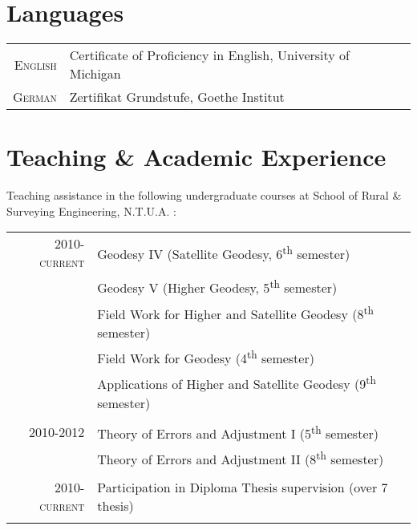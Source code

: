 \documentclass[a4paper,10pt]{article} %
\begin{document}
\section{Languages}
\begin{tabular}{rp{13cm}}

\textsc{English} & Certificate of Proficiency in English, University of Michigan \\
\textsc{German} & Zertifikat Grundstufe, Goethe Institut\\

\end{tabular}
\medskip

\section{Teaching \& Academic Experience}

Teaching assistance in the following undergraduate courses at School of Rural \& Surveying Engineering, N.T.U.A. :

\begin{longtable}{rl}

\textsc{2010-current} & 
  Geodesy IV (Satellite Geodesy, 6\textsuperscript{th} semester)\\
  & Geodesy V (Higher Geodesy, 5\textsuperscript{th} semester)\\
  & Field Work for Higher and Satellite Geodesy (8\textsuperscript{th} semester)\\
  & Field Work for Geodesy (4\textsuperscript{th} semester)\\
  & Applications of Higher and Satellite Geodesy (9\textsuperscript{th} semester)\\
&\\

\textsc{2010-2012} & 
  Theory of Errors and Adjustment I (5\textsuperscript{th} semester)\\
  & Theory of Errors and Adjustment II (8\textsuperscript{th} semester)\\
&\\

\textsc{2010-current} & 
  Participation in Diploma Thesis supervision (over 7 thesis)\\
&\\

\end{longtable}
\medskip
\end{document}
